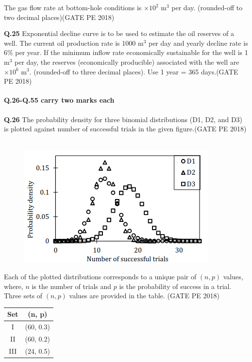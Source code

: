 \documentclass[15pt,a4paper]{article}
\begin{document}
\vspace{0.2cm}
The gas flow rate at bottom-hole conditions is \underline{\hspace{1.5cm}} $\times 10^2$ m$^3$ per day. (rounded-off to two decimal places)\hfill(GATE PE 2018)

\pagebreak

\noindent\textbf{Q.25} Exponential decline curve is to be used to estimate the oil reserves of a well. The current oil production rate is 1000 m$^3$ per day and yearly decline rate is 6\% per year. If the minimum inflow rate economically sustainable for the well is 1 m$^3$ per day, the reserves (economically producible) associated with the well are \underline{\hspace{2cm}} $\times 10^6$ m$^3$. (rounded-off to three decimal places). Use 1 year = 365 days.\hfill(GATE PE 2018)\\\\

\noindent
{\large \textbf{Q.26-Q.55 carry two marks each}}\\\\

\noindent
\textbf{Q.26} The probability density for three binomial distributions (D1, D2, and D3) is plotted against
number of successful trials in the given figure.\hfill(GATE PE 2018)\\\\


\begin{figure}[h!]
  \centering
  \includegraphics[width=0.5\columnwidth]{pic8.png} 
\end{figure}

Each of the plotted distributions corresponds to a unique pair of $(n, p)$ values, where, $n$ is the number of trials and $p$ is the probability of success in a trial. Three sets of $(n, p)$ values are provided in the table.
\hfill (GATE PE 2018)

\begin{center}
\begin{tabular}{|c|c|}
\hline
Set & (n, p) \\
\hline
I & (60, 0.3) \\
II & (60, 0.2) \\
III & (24, 0.5) \\
\hline
\end{tabular}
\end{center}
\end{document}
